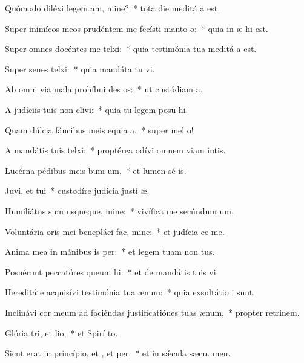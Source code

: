 \item Quómodo diléxi legem am, mine?~* tota die meditá a est.
\item Super inimícos meos prudéntem me fecísti manto o:~* quia in æ hi est.
\item Super omnes docéntes me telxi:~* quia testimónia tua meditá a est.
\item Super senes telxi:~* quia mandáta tu vi.
\item Ab omni via mala prohíbui des os:~* ut custódiam  a.
\item A judíciis tuis non clivi:~* quia tu legem posu hi.
\item Quam dúlcia fáucibus meis equia a,~* super mel  o!
\item A mandátis tuis telxi:~* proptérea odívi omnem viam intis.
\item Lucérna pédibus meis bum um,~* et lumen sé is.
\item Juvi, et tui~* custodíre judícia justí æ.
\item Humiliátus sum usqueque, mine:~* vivífica me secúndum  um.
\item Voluntária oris mei benepláci fac, mine:~* et judícia  ce me.
\item Anima mea in mánibus is per:~* et legem tuam non  tus.
\item Posuérunt peccatóres queum hi:~* et de mandátis tuis  vi.
\item Hereditáte acquisívi testimónia tua  ænum:~* quia exsultátio  i sunt.
\item Inclinávi cor meum ad faciéndas justificatiónes tuas  ænum,~* propter retrinem.
\item Glória tri, et lio,~* et Spirí to.
\item Sicut erat in princípio, et , et per,~* et in sǽcula sæcu. men.
